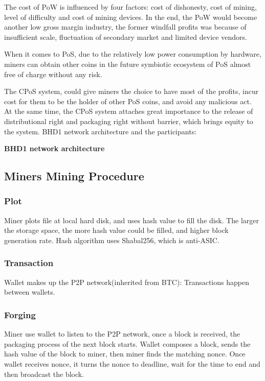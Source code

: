 \begin{flushleft}
    The cost of PoW is influenced by four factors: cost of dishonesty, cost of mining, level of difficulty and cost of mining devices. In the end, the PoW would become another low gross margin industry, the former windfall profits was because of insufficient scale, fluctuation of secondary market and limited device vendors.
\end{flushleft}
\begin{flushleft}
    When it comes to PoS, due to the relatively low power consumption by hardware, miners can obtain other coins in the future symbiotic ecosystem of PoS almost free of charge without any risk.
\end{flushleft}
\begin{flushleft}
    The CPoS system, could give miners the choice to have most of the profits, incur cost for them to be the holder of other PoS coins, and avoid any malicious act. At the same time, the CPoS system attaches great importance to the release of distributional right and packaging right without barrier, which brings equity to the system. BHD1 network architecture and the participants:
\end{flushleft}
\begin{flushleft}
    \centering\textbf{BHD1 network architecture}
\end{flushleft}

\subsection{Miners Mining Procedure}
\subsubsection{Plot}
\begin{flushleft}
    Miner plots file at local hard disk, and uses hash value to fill the disk. The larger the storage space, the more hash value could be filled, and higher block generation rate. Hash algorithm uses Shabal256, which is anti-ASIC.
\end{flushleft}
\subsubsection{Transaction}
\begin{flushleft}
    Wallet makes up the P2P network(inherited from BTC): Transactions happen between wallets.
\end{flushleft}
\subsubsection{Forging}
\begin{flushleft}
    Miner use wallet to listen to the P2P network, once a block is received, the packaging process of the next block starts. Wallet composes a block, sends the hash value of the block to miner, then miner finds the matching nonce. Once wallet receives nonce, it turns the nonce to deadline, wait for the time to end and then broadcast the block.
\end{flushleft}
